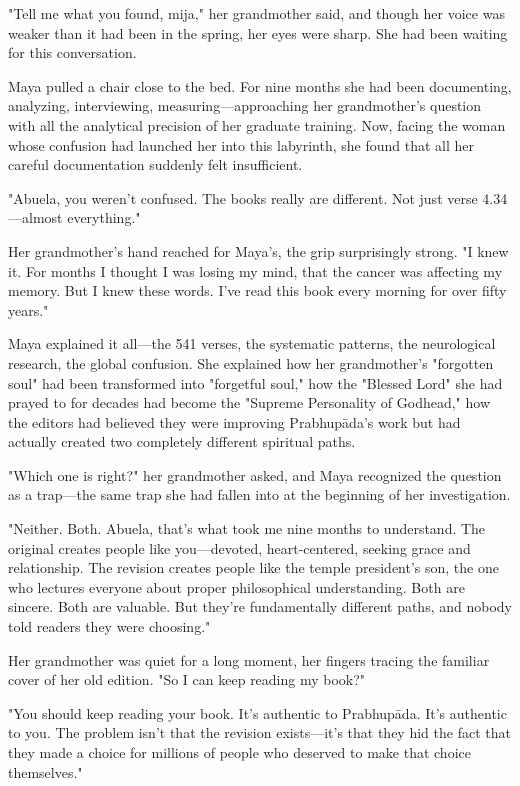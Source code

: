 \documentclass[12pt,twoside]{book}
\begin{document}
"Tell me what you found, mija," her grandmother said, and though her voice was weaker than it had been in the spring, her eyes were sharp. She had been waiting for this conversation.

Maya pulled a chair close to the bed. For nine months she had been documenting, analyzing, interviewing, measuring—approaching her grandmother's question with all the analytical precision of her graduate training. Now, facing the woman whose confusion had launched her into this labyrinth, she found that all her careful documentation suddenly felt insufficient.

"Abuela, you weren't confused. The books really are different. Not just verse 4.34—almost everything."

Her grandmother's hand reached for Maya's, the grip surprisingly strong. "I knew it. For months I thought I was losing my mind, that the cancer was affecting my memory. But I knew these words. I've read this book every morning for over fifty years."

Maya explained it all—the 541 verses, the systematic patterns, the neurological research, the global confusion. She explained how her grandmother's "forgotten soul" had been transformed into "forgetful soul," how the "Blessed Lord" she had prayed to for decades had become the "Supreme Personality of Godhead," how the editors had believed they were improving Prabhupāda's work but had actually created two completely different spiritual paths.

"Which one is right?" her grandmother asked, and Maya recognized the question as a trap—the same trap she had fallen into at the beginning of her investigation.

"Neither. Both. Abuela, that's what took me nine months to understand. The original creates people like you—devoted, heart-centered, seeking grace and relationship. The revision creates people like the temple president's son, the one who lectures everyone about proper philosophical understanding. Both are sincere. Both are valuable. But they're fundamentally different paths, and nobody told readers they were choosing."

Her grandmother was quiet for a long moment, her fingers tracing the familiar cover of her old edition. "So I can keep reading my book?"

"You should keep reading your book. It's authentic to Prabhupāda. It's authentic to you. The problem isn't that the revision exists—it's that they hid the fact that they made a choice for millions of people who deserved to make that choice themselves."
\end{document}

